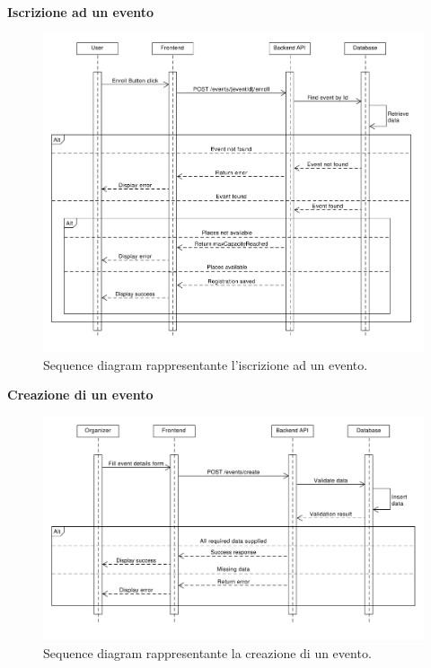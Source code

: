 \documentclass[9pt]{extarticle}
\begin{document}
\newpage
\textbf{Iscrizione ad un evento}
\begin{figure}[!htb]
	\centering
	\includegraphics[width=\linewidth]{./images/SequenceDiagramEventEnrolling.pdf}
	\caption{Sequence diagram rappresentante l'iscrizione ad un evento.}
	\label{fig:SeqDiagEventEnroll}
\end{figure}

\newpage\textbf{Creazione di un evento}
\begin{figure}[!htb]
	\centering
	\includegraphics[width=\linewidth]{./images/SequenceDiagramEventCreation.pdf}
	\caption{Sequence diagram rappresentante la creazione di un evento.}
	\label{fig:SeqDiagEventCreation}
\end{figure}
\end{document}
